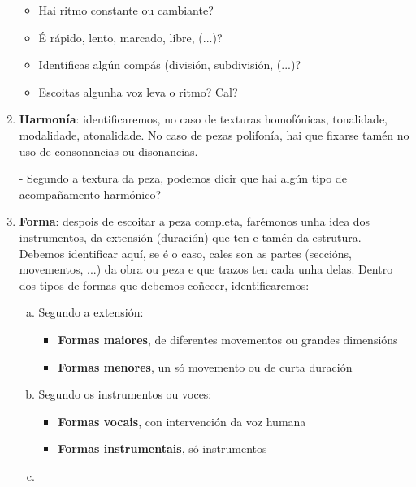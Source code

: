 \begin{enumerate}[1.-]
\begin{itemize}
            \item 
            Hai ritmo constante ou cambiante? \dotfill
            \item
            É rápido, lento, marcado, libre, (...)? \dotfill
            \item
            Identificas algún compás (división, subdivisión, (...)? \dotfill
            \item
            Escoitas algunha voz leva o ritmo? Cal? \dotfill
        \end{itemize}
%
        \item %
        \textbf{Harmonía}: identificaremos, no caso de texturas homofónicas, tonalidade, modalidade, atonalidade. No caso de pezas polifonía, hai que fixarse tamén no uso de consonancias ou disonancias.
        \par %
        - Segundo a textura da peza, podemos dicir que hai algún tipo de acompañamento harmónico? \dotfill
%
        \item %
        \textbf{Forma}: despois de escoitar a peza completa, farémonos unha idea dos instrumentos, da extensión (duración) que ten e tamén da estrutura. Debemos identificar aquí, se é o caso, cales son as partes (seccións, movementos, ...) da obra ou peza e que trazos ten cada unha delas. Dentro dos tipos de formas que debemos coñecer, identificaremos:
            \begin{enumerate}[a)]
                \item
                Segundo a extensión:
                \begin{itemize}
                    \item
                    \textbf{Formas maiores}, de diferentes movementos ou grandes dimensións
                    \item
                    \textbf{Formas menores}, un só movemento ou de curta duración
                \end{itemize}
                \item
                Segundo os instrumentos ou voces:
                 \begin{itemize}
                    \item
                    \textbf{Formas vocais}, con intervención da voz humana
                    \item
                    \textbf{Formas instrumentais}, só instrumentos
                \end{itemize}
                \item 

\end{enumerate}
\end{enumerate}
